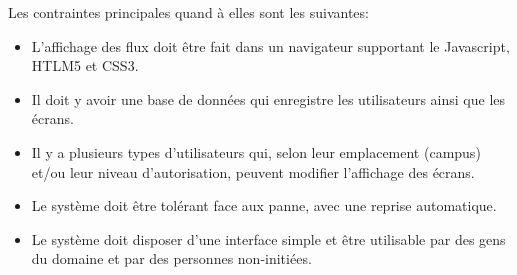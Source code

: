 \documentclass[french]{article}
\begin{document}
\begin{appendices}
Les contraintes principales quand à elles sont les suivantes:
\begin{itemize}
	\item L'affichage des flux doit être fait dans un navigateur supportant le Javascript, HTLM5 et CSS3.
	\item Il doit y avoir une base de données qui enregistre les utilisateurs ainsi que les écrans.
	\item Il y a plusieurs types d'utilisateurs qui, selon leur emplacement (campus) et/ou leur niveau d'autorisation, peuvent modifier l'affichage des écrans.
	\item Le système doit être tolérant face aux panne, avec une reprise automatique.
	\item Le système doit disposer d'une interface simple et être utilisable par des gens du domaine et par des personnes non-initiées.
\end{itemize}



\end{appendices}
\end{document}
